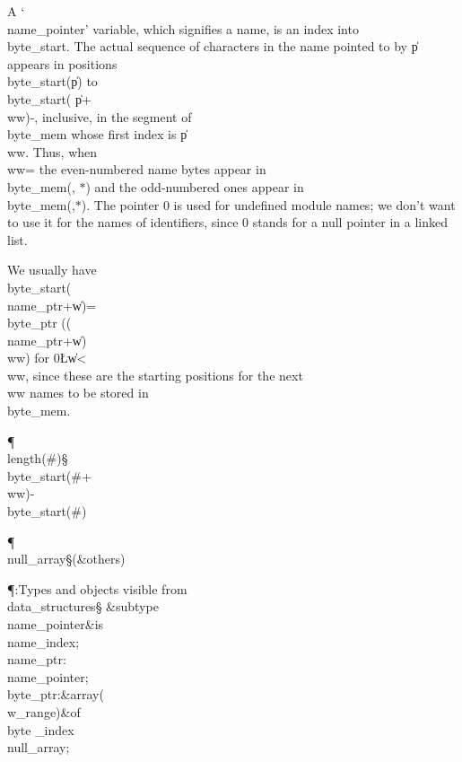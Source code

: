 A `\\{name\_pointer}' variable, which signifies a name, is an index into
\\{byte\_start}. The actual sequence of characters in the name pointed to by
\|p appears in positions \\{byte\_start}\?(\?\|p\?)\? to \\{byte\_start}\?(\?%
\|p\?+\?\\{ww}\?)-, inclusive,
in the segment of \\{byte\_mem} whose first index is \|p\?\?%
\\{ww}. Thus, when
\\{ww}\?= the even-numbered name bytes appear in \\{byte\_mem}\?(\?,\?%
\hbox{$*$}\?)\?
and the odd-numbered ones appear in \\{byte\_mem}\?(\?,\?\hbox{$*$}\?)\?.
The pointer 0 is used for undefined module names; we don't
want to use it for the names of identifiers, since 0 stands for a null
pointer in a linked list.

We usually have \\{byte\_start}\?(\?\\{name\_ptr}\?+\?\|w\?)=\?\\{byte\_ptr}%
\?((\?\\{name\_ptr}\?+\?\|w\?)\?\\{ww}\?)\?
for 0\?\L\?\|w\?<\?\\{ww}, since these are the starting positions for the next %
\\{ww}
names to be stored in \\{byte\_mem}.

\Y\P\4\D\\{length}\?\1(\?\#\?\2)\S\?\\{byte\_start}\?\1(\?\#\?+\?\\{ww}\?\2)-\?%
\\{byte\_start}\?\1(\?\#\?\2)\6
\?\par
\P\4\D\\{null\_array}\?\S\1(\?\&{others}\?\8\KR{}\?\2)\6
\?\par
\Y\P\?\4:Types and objects visible from \\{data\_structures}\X\mathrel{+}\S%
\?\6
\&{subtype}\8\\{name\_pointer}\8\&{is}\8\\{name\_index};\7
\\{name\_ptr}\?:\?\\{name\_pointer}\?\K{};\6
\\{byte\_ptr}\?:\1\&{array}\8\1(\?\\{w\_range}\?\2)\2\8\&{of}\?\8\\{byte%
\_index}\?\K\?\\{null\_array};\par
\fi

